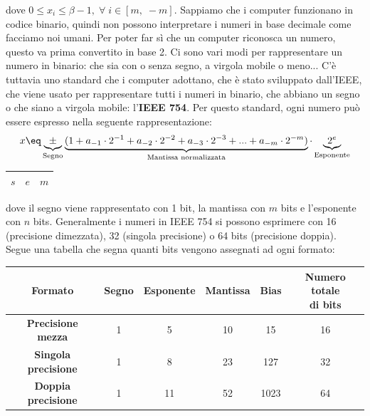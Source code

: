 dove $0 \leq x_i \leq \beta - 1, \; \forall \; i \in [m, \; -m]$.
\nl
Sappiamo che i computer funzionano in codice binario, quindi non possono interpretare i numeri in base decimale come facciamo noi umani. Per poter far sì che un computer riconosca un numero, questo va prima convertito in base 2. Ci sono vari modi per rappresentare un numero in binario: che sia con o senza segno, a virgola mobile o meno... C'è tuttavia uno standard che i computer adottano, che è stato sviluppato dall'IEEE, che viene usato per rappresentare tutti i numeri in binario, che abbiano un segno o che siano a virgola mobile: l'\textbf{IEEE 754}.
\nl
Per questo standard, ogni numero può essere espresso nella seguente rappresentazione:
\[ x \eq \underbrace{\pm}_{\text{Segno}} \underbrace{(1 + a_{-1} \cdot 2^{-1} + a_{-2} \cdot 2^{-2} + a_{-3} \cdot 2^{-3} + ... + a_{-m} \cdot 2^{-m})}_{\text{Mantissa normalizzata}} \cdot \underbrace{2^e}_{\text{Esponente}} \]
\begin{center}
    \begin{tabular}{|c||c||c|}
        \hline
        $s$ & \hspace{1cm}$e$\hspace{1cm} & \hspace{3cm}$m$\hspace{3cm} \\
        \hline
    \end{tabular}
\end{center}

dove il segno viene rappresentato con 1 bit, la mantissa con $m$ bits e l'esponente con $n$ bits. Generalmente i numeri in IEEE 754 si possono esprimere con 16 (precisione dimezzata), 32 (singola precisione) o 64 bits (precisione doppia). Segue una tabella che segna quanti bits vengono assegnati ad ogni formato:
\begin{center}
    \begin{tabular}{|c|c|c|c|c|c|}
        \hline
        \textbf{Formato} & \textbf{Segno} & \textbf{Esponente} & \textbf{Mantissa} & \textbf{Bias} & \makecell{\textbf{Numero totale}\\\textbf{di bits}} \\
        \hline\hline
        \textbf{Precisione mezza} & 1 & 5 & 10 & 15 & 16 \\
        \hline
        \textbf{Singola precisione} & 1 & 8 & 23 & 127 & 32 \\
        \hline
        \textbf{Doppia precisione} & 1 & 11 & 52 & 1023 & 64 \\
        \hline
    \end{tabular}
\end{center}

